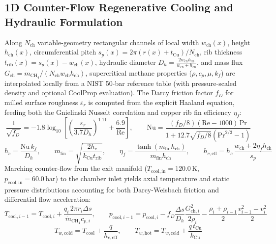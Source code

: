 \documentclass[11pt,a4paper]{article}
\begin{document}
\subsection{1D Counter-Flow Regenerative Cooling and Hydraulic Formulation}
Along $N_{\mathrm{ch}}$ variable-geometry rectangular channels of local width $w_{\mathrm{ch}}(x)$, height $h_{\mathrm{ch}}(x)$, circumferential pitch $s_p(x) = 2\pi(r(x) + t_{\mathrm{Cu}})/N_{\mathrm{ch}}$, rib thickness $t_{\mathrm{rib}}(x) = s_p(x) - w_{\mathrm{ch}}(x)$, hydraulic diameter $D_h = \frac{2 w_{\mathrm{ch}} h_{\mathrm{ch}}}{w_{\mathrm{ch}} + h_{\mathrm{ch}}}$, and mass flux $G_{\mathrm{ch}} = \dot{m}_{\mathrm{CH_4}} / (N_{\mathrm{ch}} w_{\mathrm{ch}} h_{\mathrm{ch}})$, supercritical methane properties ($\rho, c_p, \mu, k_f$) are interpolated locally from a NIST 50-bar reference table (with pressure-scaled density and optional CoolProp evaluation). The Darcy friction factor $f_D$ for milled surface roughness $\varepsilon_r$ is computed from the explicit Haaland equation, feeding both the Gnielinski Nusselt correlation and copper rib fin efficiency $\eta_f$:
\begin{equation}
\frac{1}{\sqrt{f_D}} = -1.8 \log_{10}\!\left[\left(\frac{\varepsilon_r}{3.7 D_h}\right)^{1.11} + \frac{6.9}{\mathrm{Re}}\right], \qquad
\mathrm{Nu} = \frac{(f_D/8)(\mathrm{Re} - 1000)\,\mathrm{Pr}}{1 + 12.7\sqrt{f_D/8}\left(\mathrm{Pr}^{2/3} - 1\right)}
\end{equation}
\begin{equation}
h_c = \frac{\mathrm{Nu}\,k_f}{D_h}, \qquad
m_{\mathrm{fin}} = \sqrt{\frac{2 h_c}{k_{\mathrm{Cu}} t_{\mathrm{rib}}}}, \qquad
\eta_f = \frac{\tanh(m_{\mathrm{fin}} h_{\mathrm{ch}})}{m_{\mathrm{fin}} h_{\mathrm{ch}}}, \qquad
h_{c,\mathrm{eff}} = h_c \, \frac{w_{\mathrm{ch}} + 2\eta_f h_{\mathrm{ch}}}{s_p}
\end{equation}
Marching counter-flow from the exit manifold ($T_{\mathrm{cool,in}} = 120.0\,\mathrm{K}$, $p_{\mathrm{cool,in}} = 60.0\,\mathrm{bar}$) to the chamber inlet yields axial temperature and static pressure distributions accounting for both Darcy-Weisbach friction and differential flow acceleration:
\begin{equation}
T_{\mathrm{cool},i-1} = T_{\mathrm{cool},i} + \frac{q_i \, 2\pi r_i \Delta s}{\dot{m}_{\mathrm{CH_4}} c_{p,i}}, \qquad
p_{\mathrm{cool},i-1} = p_{\mathrm{cool},i} - f_D \frac{\Delta s}{D_h} \frac{G_{\mathrm{ch},i}^2}{2\rho_i} - \frac{\rho_i + \rho_{i-1}}{2}\frac{v_{i-1}^2 - v_i^2}{2}
\end{equation}
\begin{equation}
T_{w,\mathrm{cold}} = T_{\mathrm{cool}} + \frac{q}{h_{c,\mathrm{eff}}}, \qquad
T_{w,\mathrm{hot}} = T_{w,\mathrm{cold}} + \frac{q \, t_{\mathrm{Cu}}}{k_{\mathrm{Cu}}}
\end{equation}
\end{document}
